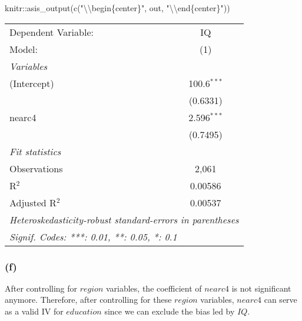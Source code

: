 \documentclass[
]{article}
\newenvironment{Shaded}{\begin{snugshade}}{\end{snugshade}}
\newcommand{\FunctionTok}[1]{\textcolor[rgb]{0.00,0.00,0.00}{#1}}
\newcommand{\NormalTok}[1]{#1}
\newcommand{\SpecialCharTok}[1]{\textcolor[rgb]{0.00,0.00,0.00}{#1}}
\newcommand{\StringTok}[1]{\textcolor[rgb]{0.31,0.60,0.02}{#1}}
\begin{document}
\begin{Shaded}
\begin{Highlighting}[]
\NormalTok{knitr}\SpecialCharTok{::}\FunctionTok{asis\_output}\NormalTok{(}\FunctionTok{c}\NormalTok{(}\StringTok{"}\SpecialCharTok{\textbackslash{}\textbackslash{}}\StringTok{begin\{center\}"}\NormalTok{, out, }\StringTok{"}\SpecialCharTok{\textbackslash{}\textbackslash{}}\StringTok{end\{center\}"}\NormalTok{)) }
\end{Highlighting}
\end{Shaded}

\begin{center}\begingroup\centering\begin{tabular}{lc}   \tabularnewline \midrule \midrule   Dependent Variable: & IQ\\     Model:              & (1)\\     \midrule   \emph{Variables}\\   (Intercept)         & 100.6$^{***}$\\                          & (0.6331)\\      nearc4              & 2.596$^{***}$\\                          & (0.7495)\\      \midrule   \emph{Fit statistics}\\   Observations        & 2,061\\     R$^2$               & 0.00586\\     Adjusted R$^2$      & 0.00537\\     \midrule \midrule   \multicolumn{2}{l}{\emph{Heteroskedasticity-robust standard-errors in parentheses}}\\   \multicolumn{2}{l}{\emph{Signif. Codes: ***: 0.01, **: 0.05, *: 0.1}}\\\end{tabular}\par\endgroup\end{center}

\newpage

\hypertarget{f}{%
\subsubsection{(f)}\label{f}}

After controlling for \(region\) variables, the coefficient of
\(nearc4\) is not significant anymore. Therefore, after controlling for
these \(region\) variables, \(nearc4\) can serve as a valid IV for
\(education\) since we can exclude the bias led by \(IQ\).
\end{document}
